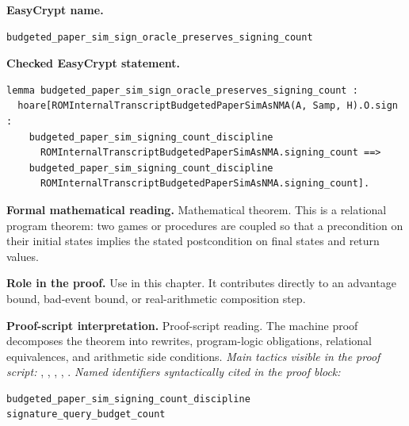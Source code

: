 \begin{formaltheorem}
\noindent\textbf{EasyCrypt name.}
\begin{lstlisting}[language=EasyCrypt,basicstyle=\ttfamily\scriptsize]
budgeted_paper_sim_sign_oracle_preserves_signing_count
\end{lstlisting}
\noindent\textbf{Checked EasyCrypt statement.}
\begin{lstlisting}[language=EasyCrypt,basicstyle=\ttfamily\scriptsize]
lemma budgeted_paper_sim_sign_oracle_preserves_signing_count :
  hoare[ROMInternalTranscriptBudgetedPaperSimAsNMA(A, Samp, H).O.sign :
    budgeted_paper_sim_signing_count_discipline
      ROMInternalTranscriptBudgetedPaperSimAsNMA.signing_count ==>
    budgeted_paper_sim_signing_count_discipline
      ROMInternalTranscriptBudgetedPaperSimAsNMA.signing_count].
\end{lstlisting}
\noindent\textbf{Formal mathematical reading.}
Mathematical theorem. This is a relational program theorem: two games or procedures are coupled so that a precondition on their initial states implies the stated postcondition on final states and return values.

\noindent\textbf{Role in the proof.}
Use in this chapter. It contributes directly to an advantage bound, bad-event bound, or real-arithmetic composition step.

\noindent\textbf{Proof-script interpretation.}
Proof-script reading. The machine proof decomposes the theorem into rewrites, program-logic obligations, relational equivalences, and arithmetic side conditions.
\emph{Main tactics visible in the proof script:} , , , , .
\emph{Named identifiers syntactically cited in the proof block:}
\begin{lstlisting}[language=EasyCrypt,basicstyle=\ttfamily\scriptsize]
budgeted_paper_sim_signing_count_discipline
signature_query_budget_count
\end{lstlisting}

\end{formaltheorem}

